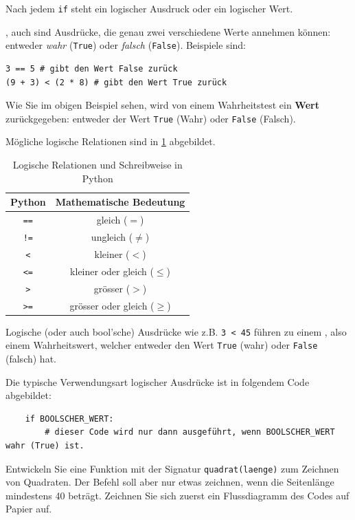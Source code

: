 Nach jedem \lstinline|if| steht ein logischer Ausdruck oder ein logischer Wert.

\begin{mydefinition}
, auch  sind Ausdrücke, die genau zwei verschiedene Werte annehmen können: entweder \textit{wahr} (\lstinline|True|) oder \textit{falsch} (\lstinline|False|). Beispiele sind:
\begin{lstlisting}
3 == 5 # gibt den Wert False zurück
(9 + 3) < (2 * 8) # gibt den Wert True zurück
\end{lstlisting}

Wie Sie im obigen Beispiel sehen, wird von einem Wahrheitstest ein \textbf{Wert} zurückgegeben: entweder der Wert \lstinline|True| (Wahr) oder \lstinline|False| (Falsch).

Mögliche logische Relationen sind in \cref{table:bool} abgebildet.
\begin{table}[H]
	\centering
	\begin{tabular}{c||c}
		\textbf{Python} & \textbf{Mathematische Bedeutung} \\\midrule
		\lstinline|==|  & gleich ($=$)                     \\
		\lstinline|!=|  & ungleich ($\neq$)                \\
		\lstinline|<|   & kleiner ($<$)                    \\
		\lstinline|<=|  & kleiner oder gleich ($\leq$)     \\
		\lstinline|>|   & grösser ($>$)                    \\
		\lstinline|>=|  & grösser oder gleich ($\geq$)
	\end{tabular}
	\caption{Logische Relationen und Schreibweise in Python}
	\label{table:bool}
\end{table}
Logische (oder auch bool'sche) Ausdrücke wie z.B. \lstinline|3 < 45| führen zu einem , also einem Wahrheitswert, welcher entweder den Wert \lstinline|True| (wahr) oder \lstinline|False| (falsch) hat.

Die typische Verwendungsart logischer Ausdrücke ist in folgendem Code abgebildet:
\begin{lstlisting}
	if BOOLSCHER_WERT:
		# dieser Code wird nur dann ausgeführt, wenn BOOLSCHER_WERT wahr (True) ist.
\end{lstlisting}
\end{mydefinition}



\begin{myexercise}
	Entwickeln Sie eine Funktion mit der Signatur \lstinline|quadrat(laenge)| zum Zeichnen von Quadraten. Der Befehl soll aber nur etwas zeichnen, wenn die Seitenlänge mindestens 40 beträgt. Zeichnen Sie sich zuerst ein Flussdiagramm des Codes auf Papier auf.
	\begin{myanswer}
		
	\end{myanswer}
\end{myexercise}

